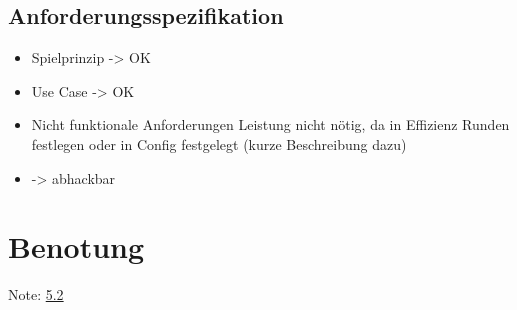 \documentclass[11pt]{scrartcl}
\begin{document}
\subsection{Anforderungsspezifikation}
\begin{itemize}
    \item Spielprinzip -> OK
    \item Use Case -> OK
    \item Nicht funktionale Anforderungen
    \subitem Leistung nicht nötig, da in Effizienz
    \subitem Runden festlegen oder in Config festgelegt (kurze Beschreibung dazu)
    \item -> abhackbar
\end{itemize}


\section{Benotung}
\label{sec:Benotung}
Note: \underline {5.2}
\end{document}
